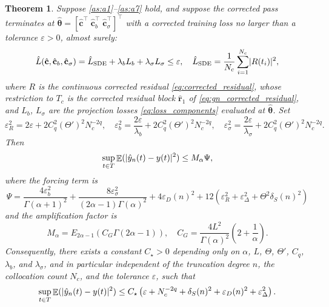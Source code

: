 \documentclass[11pt, a4paper]{article}
\theoremstyle{theoremstyle}
\newtheorem{theorem}{Theorem}[section]
\theoremstyle{definitionstyle}
\DeclareMathOperator{\EE}{\mathbb E}
\DeclarePairedDelimiter{\abs}{\lvert}{\rvert}
\begin{document}
\begin{theorem}\label{thm:convergence}
    Suppose \ref{as:a1}--\ref{as:a7} hold, and suppose the corrected pass terminates at $\hat{\boldsymbol\theta} = [\hat{\mathbf c}^\top \; \hat{\mathbf c}_b^\top \; \hat{\mathbf c}_\sigma^\top]^\top$ with a corrected training loss no larger than a tolerance $\varepsilon > 0$, almost surely:
    \begin{equation}\label{eq:corrected_loss}
        \hat L(\hat{\mathbf c}, \hat{\mathbf c}_b, \hat{\mathbf c}_\sigma) = \hat L_{\mathrm{SDE}} + \lambda_bL_b + \lambda_\sigma L_\sigma \leq \varepsilon, \quad \hat L_{\mathrm{SDE}} = \frac 1{N_c}\sum_{i=1}^{N_c}\abs{R(t_i)}^2,
    \end{equation}
    where $R$ is the continuous corrected residual \eqref{eq:corrected_residual}, whose restriction to $T_c$ is the corrected residual block $\hat{\mathbf r}_1$ of \eqref{eq:gn_corrected_residual}, and $L_b$, $L_\sigma$ are the projection losses \eqref{eq:loss_components} evaluated at $\hat{\boldsymbol\theta}$. Set
    \begin{equation}\label{eq:eps_defs}
        \varepsilon_R^2 = 2\varepsilon + 2C_q^2(\Theta')^2N_c^{-2q}, \quad \varepsilon_b^2 = \frac{2\varepsilon}{\lambda_b} + 2C_q^2(\Theta')^2N_c^{-2q}, \quad \varepsilon_\sigma^2 = \frac{2\varepsilon}{\lambda_\sigma} + 2C_q^2(\Theta')^2N_c^{-2q}.
    \end{equation}
    Then
    \begin{equation}\label{eq:main_bound}
        \sup_{t \in T} \EE (\abs{\hat y_n(t) - y(t)}^2) \leq M_\alpha \Psi,
    \end{equation}
    where the forcing term is
    \begin{equation}\label{eq:Psi}
        \Psi = \frac{4\varepsilon_b^2}{\Gamma(\alpha+1)^2} + \frac{8\varepsilon_\sigma^2}{(2\alpha-1)\Gamma(\alpha)^2} + 4\varepsilon_D(n)^2 + 12 \left ( \varepsilon_R^2 + \varepsilon_\Delta^2 + \Theta^2\delta_S(n)^2 \right )
    \end{equation}
    and the amplification factor is
    \begin{equation}\label{eq:Malpha}
        M_\alpha = E_{2\alpha-1}(C_G\Gamma(2\alpha-1)), \quad C_G = \frac{4L^2}{\Gamma(\alpha)^2}\left ( 2 + \frac 1\alpha \right ).
    \end{equation}
    Consequently, there exists a constant $C_\star > 0$ depending only on $\alpha$, $L$, $\Theta$, $\Theta'$, $C_q$, $\lambda_b$, and $\lambda_\sigma$, and in particular independent of the truncation degree $n$, the collocation count $N_c$, and the tolerance $\varepsilon$, such that
    \begin{equation}\label{eq:five_term_rate}
        \sup_{t \in T} \EE (\abs{\hat y_n(t) - y(t)}^2) \leq C_\star \left ( \varepsilon + N_c^{-2q} + \delta_S(n)^2 + \varepsilon_D(n)^2 + \varepsilon_\Delta^2 \right ).
    \end{equation}
\end{theorem}
\end{document}
